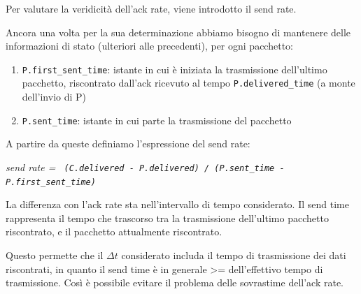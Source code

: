 Per valutare la veridicità dell'ack rate, viene introdotto il send rate. \bigskip

Ancora una volta per la sua determinazione abbiamo bisogno di mantenere delle informazioni di stato (ulteriori alle precedenti), per ogni pacchetto:

\begin{enumerate}

\item \texttt{P.first\_sent\_time}: istante in cui è iniziata la trasmissione dell’ultimo pacchetto, riscontrato dall’ack ricevuto al tempo \texttt{P.delivered\_time} (a monte dell’invio di P) 
\item \texttt{P.sent\_time}: istante in cui parte la trasmissione del pacchetto

\end{enumerate}

A partire da queste definiamo l'espressione del send rate:

\begin{center}
 
\textit{send rate = \texttt{ (C.delivered - P.delivered) / (P.sent\_time - P.first\_sent\_time)}}

\end{center}

La differenza con l'ack rate sta nell'intervallo di tempo considerato. Il send time rappresenta il tempo che trascorso tra la trasmissione dell'ultimo pacchetto riscontrato, e il pacchetto attualmente riscontrato. \bigskip

Questo permette che il $\Delta t$ considerato includa il tempo di trasmissione dei dati riscontrati, in quanto il send time è in generale >= dell'effettivo tempo di trasmissione. Così è possibile evitare il problema delle sovrastime dell'ack rate. \bigskip

